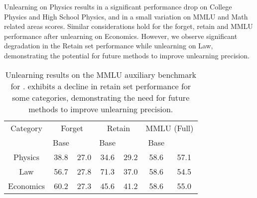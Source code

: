 Unlearning on Physics results in a significant performance drop on College Physics and High School Physics, and in a small variation on MMLU and Math related areas scores. Similar considerations hold for the forget, retain and MMLU performance after unlearning on Economics. However, we observe significant degradation in the Retain set performance while unlearning on Law, demonstrating the potential for future methods to improve unlearning precision.

\begin{table}[H]
    \centering
    \begin{tabular}{c|cc|cc|cc}
        Category & \multicolumn{2}{|c}{Forget} & \multicolumn{2}{|c}{Retain} & \multicolumn{2}{|c}{MMLU (Full)} \\
        & Base & \method{} & Base & \method{} & Base & \method{} \\
        \hline \noalign{\vspace{0.25ex}} \hline \noalign{\vspace{0.25ex}}
        Physics & 38.8 & 27.0 & 34.6 & 29.2 & 58.6 & 57.1 \\
        Law & 56.7 & 27.8 & 71.3 & 37.0 & 58.6 & 54.5 \\
        Economics & 60.2 & 27.3 & 45.6 & 41.2 & 58.6 & 55.0 \\
    \end{tabular}

    \caption{Unlearning results on the MMLU auxiliary benchmark for \zephyr{}. \method{} exhibits a decline in retain set performance for some categories, demonstrating the need for future methods to improve unlearning precision.}
    \label{tab:mmlu_unlearning}
\end{table}
